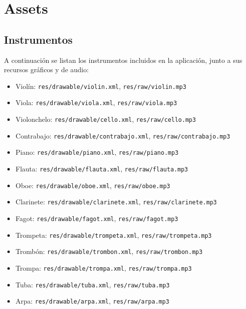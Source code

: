 \documentclass{article}
\newcommand{\iconpath}{/home/khz/git/tabler-icons/icons/outline-white/}
\newcommand{\icon}[1]{}
\newcommand{\instrumentopath}{/home/khz/Documentos/Carrera/MusiKe/instrumentos/svg/}
\newcommand{\instrumento}[1]{\raisebox{-0.6em}{}}
\begin{document}
\section{Assets}

\subsection{Instrumentos \icon{music}}

A continuación se listan los instrumentos incluidos en la aplicación, junto a sus recursos gráficos y de audio:

\begin{itemize}
  \item \instrumento{viola} Violín: \texttt{res/drawable/violin.xml}, \texttt{res/raw/violin.mp3}
  \item \instrumento{viola} Viola: \texttt{res/drawable/viola.xml}, \texttt{res/raw/viola.mp3}
  \item \instrumento{cello} Violonchelo: \texttt{res/drawable/cello.xml}, \texttt{res/raw/cello.mp3}
  \item \instrumento{contrabajo} Contrabajo: \texttt{res/drawable/contrabajo.xml}, \texttt{res/raw/contrabajo.mp3}
  \item \instrumento{piano} Piano: \texttt{res/drawable/piano.xml}, \texttt{res/raw/piano.mp3}
  \item \instrumento{flauta} Flauta: \texttt{res/drawable/flauta.xml}, \texttt{res/raw/flauta.mp3}
  \item \instrumento{oboe} Oboe: \texttt{res/drawable/oboe.xml}, \texttt{res/raw/oboe.mp3}
  \item \instrumento{clarinete} Clarinete: \texttt{res/drawable/clarinete.xml}, \texttt{res/raw/clarinete.mp3}
  \item \instrumento{fagot} Fagot: \texttt{res/drawable/fagot.xml}, \texttt{res/raw/fagot.mp3}
  \item \instrumento{trompeta} Trompeta: \texttt{res/drawable/trompeta.xml}, \texttt{res/raw/trompeta.mp3}
  \item \instrumento{trombon} Trombón: \texttt{res/drawable/trombon.xml}, \texttt{res/raw/trombon.mp3}
  \item \instrumento{trompa} Trompa: \texttt{res/drawable/trompa.xml}, \texttt{res/raw/trompa.mp3}
  \item \instrumento{tuba} Tuba: \texttt{res/drawable/tuba.xml}, \texttt{res/raw/tuba.mp3}
  \item \instrumento{arpa} Arpa: \texttt{res/drawable/arpa.xml}, \texttt{res/raw/arpa.mp3}

\end{itemize}
\end{document}
